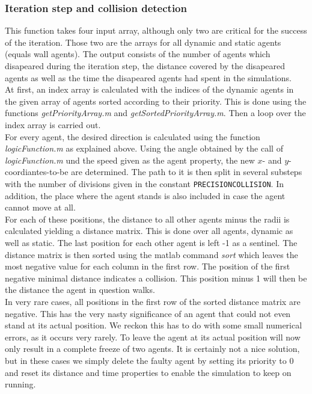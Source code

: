 \subsubsection{Iteration step and collision detection}
This function takes four input array, although only two are critical for the success of the iteration. Those two are the arrays for all dynamic and static agents (equals wall agents). The output consists of the number of agents which disapeared during the iteration step, the distance covered by the disapeared agents as well as the time the disapeared agents had spent in the simulations.\\
At first, an index array is calculated with the indices of the dynamic agents in the given array of agents sorted according to their priority. This is done using the functions \textit{getPriorityArray.m} and \textit{getSortedPriorityArray.m}. Then a loop over the index array is carried out.\\
For every agent, the desired direction is calculated using the function \textit{logicFunction.m} as explained above. Using the angle obtained by the call of \textit{logicFunction.m} und the speed given as the agent property, the new $x$- and $y$-coordiantes-to-be are determined. The path to it is then split in several substeps with the number of divisions given in the constant \texttt{PRECISIONCOLLISION}. In addition, the place where the agent stands is also included in case the agent cannot move at all.\\
For each of these positions, the distance to all other agents minus the radii is calculated yielding a distance matrix. This is done over all agents, dynamic as well as static. The last position for each other agent is left -1 as a sentinel. The distance matrix is then sorted using the matlab command \textit{sort} which leaves the most negative value for each column in the first row. The position of the first negative minimal distance indicates a collision. This position minus 1 will then be the distance the agent in question walks.\\
\noi In very rare cases, all positions in the first row of the sorted distance matrix are negative. This has the very nasty significance of an agent that could not even stand at its actual position. We reckon this has to do with some small numerical errors, as it occurs very rarely. To leave the agent at its actual position will now only result in a complete freeze of two agents. It is certainly not a nice solution, but in these cases we simply delete the faulty agent by setting its priority to 0 and reset its distance and time properties to enable the simulation to keep on running.
